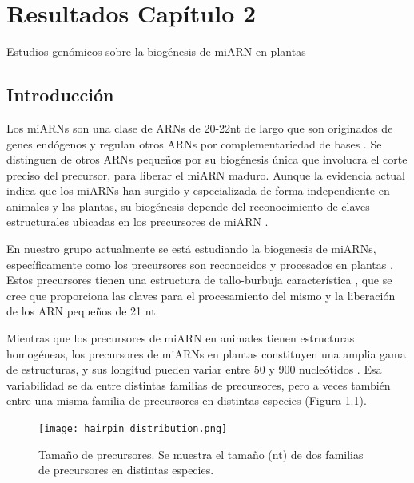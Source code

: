 
\chapter{Resultados Capítulo 2} 
{\LARGE Estudios genómicos sobre la biogénesis de miARN en plantas}

\graphicspath{{Chapter2/Figs/}}

\section{Introducción}
Los miARNs son una clase de ARNs de 20-22nt de largo que son originados de genes endógenos y regulan otros ARNs por complementariedad de bases \citep{Voinnet2009669}.
Se distinguen de otros ARNs pequeños por su biogénesis única que involucra el corte preciso del precursor, para liberar el miARN maduro.
Aunque la evidencia actual indica que los miARNs han surgido y especializada de forma independiente en animales y las plantas, su biogénesis depende del reconocimiento de claves estructurales ubicadas en los precursores de miARN \citep{pmid21554756,citeulike:8816489,Bologna11112012}.

En nuestro grupo actualmente se está estudiando la biogenesis de miARNs, específicamente como los precursores son reconocidos y procesados en plantas \citep{Bologna2013}.
Estos precursores tienen una estructura de tallo-burbuja característica \citep{Jones-Rhoades2006}, que se cree que proporciona las claves para el procesamiento del mismo y la liberación de los ARN pequeños de 21 nt.

Mientras que los precursores de miARN en animales tienen estructuras homogéneas, los precursores de miARNs en plantas constituyen una amplia gama de estructuras, y sus longitud pueden variar entre 50 y 900 nucleótidos \citep{Bologna2013,citeulike:8816489}.
Esa variabilidad se da entre distintas familias de precursores, pero a veces también entre una misma familia de precursores en distintas especies (Figura \ref{fig:hairpin_distribution}).

\begin{figure}[htbp!] 
    \centering    
    \texttt{[image: hairpin\_distribution.png]}
    \caption[Tamaño de precursores]{Tamaño de precursores. Se muestra el tamaño (nt) de dos familias de precursores en distintas especies.}
    \label{fig:hairpin_distribution}
\end{figure}

